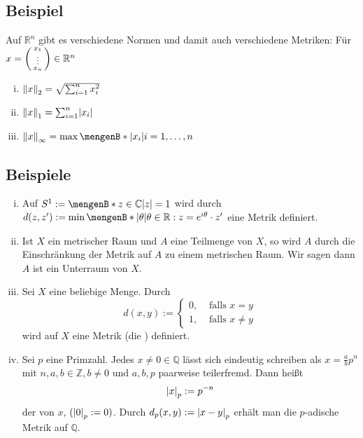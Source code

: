 \subsection[Beispiel: Normen auf $\mathds{R}^n$]{Beispiel} %
\label{sub:13}
Auf $\mathds{R}^n$ gibt es verschiedene Normen und damit auch verschiedene Metriken: Für $x= \begin{psmallmatrix}
	x_1 \\ \vdots \\ x_n
\end{psmallmatrix} \in \mathds{R}^n$
\begin{enumerate}[(i)]
	\item $\norm[2]{x} = \sqrt{\sum_{i=1}^{n} x_i^2}  $
	\item $\norm[1]{x}  = \sum_{i=1}^{n} \abs{x_i} $
	\item $\norm[\infty]{x} = \max \set[\abs{x_i} ]{i=1, \ldots , n}  $
\end{enumerate}

\subsection[Beispiele für Metriken]{Beispiele} %
\label{sub:14}
\begin{enumerate}[(i)]
	\item Auf \(
		S^1 := \set[z \in \mathds{C}]{\abs*{z} = 1 } 
	\)
	wird durch $d(z,z') := \min \set[\abs*{\theta} ]{\theta \in \mathds{R} : z = e^{i \theta} \cdot z'} $ eine Metrik definiert.
	\item Ist $X$ ein metrischer Raum und $A$ eine Teilmenge von $X$, so wird $A$ durch die Einschränkung der Metrik auf $A$ zu einem metrischen Raum. Wir sagen dann $A$ 
	ist ein Unterraum von $X$.
	\item Sei $X$ eine beliebige Menge. Durch
	\[
		d(x,y) := \begin{cases}
			0, &\text{ falls } x=y\\
			1, &\text{ falls } x \not= y
		\end{cases}
	\]
	wird auf $X$ eine Metrik (die ) definiert.
	\item Sei $p$ eine Primzahl. Jedes $x \not= 0 \in \mathds{Q}$ lässt sich eindeutig schreiben als $x = \frac{a}{b} p^n$ mit $n,a,b \in \mathds{Z}, b \not= 0$ und $a,b,p$
	paarweise teilerfremd. Dann heißt
	\[
		\abs*{x}_p := p^{-n} 
	\]
	der  von $x$, $(\abs*{0}_p := 0 )$. Durch $d_p(x,y) := \abs*{x-y}_p $ erhält man die $p$-adische
	 Metrik auf $\mathds{Q}$. 
\end{enumerate}

